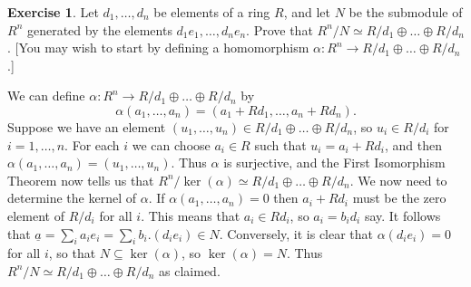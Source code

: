 \documentclass{amsart}
\newcommand{\al}        {\alpha}
\newcommand{\un}[1]     {\underline{#1}}
\newcommand{\sse}       {\subseteq}
\newcommand{\xra}       {\xrightarrow}
\newcommand{\op}        {\oplus}
\renewcommand{\:}{\colon}
\theoremstyle{definition}
\newtheorem{exercise}{Exercise}[section]
\renewenvironment{solution}{\SolutionAtEnd}{\endSolutionAtEnd}
\begin{document}
\begin{exercise}
 Let $d_1,\ldots,d_n$ be elements of a ring $R$, and let $N$ be the
 submodule of $R^n$ generated by the elements $d_1e_1,\ldots,d_ne_n$.
 Prove that $R^n/N\simeq R/d_1\op\ldots\op R/d_n$.  [You may wish to
 start by defining a homomorphism
 $\al\:R^n\xra{}R/d_1\op\ldots\op R/d_n$.]
\end{exercise}
\begin{solution}
 We can define $\al\:R^n\xra{}R/d_1\op\ldots\op R/d_n$ by 
 \[ \al(a_1,\ldots,a_n) = (a_1+Rd_1,\ldots,a_n+Rd_n). \]
 Suppose we have an element
 $(u_1,\ldots,u_n)\in R/d_1\op\ldots\op R/d_n$, so $u_i\in R/d_i$ for
 $i=1,\ldots,n$.  For each $i$ we can choose $a_i\in R$ such that
 $u_i=a_i+Rd_i$, and then $\al(a_1,\ldots,a_n)=(u_1,\ldots,u_n)$.
 Thus $\al$ is surjective, and the First Isomorphism Theorem now tells
 us that $R^n/\ker(\al)\simeq R/d_1\op\ldots\op R/d_n$.  We now need
 to determine the kernel of $\al$.  If $\al(a_1,\ldots,a_n)=0$ then
 $a_i+Rd_i$ must be the zero element of $R/d_i$ for all $i$.  This
 means that $a_i\in Rd_i$, so $a_i=b_id_i$ say.  It follows that
 $\un{a}=\sum_ia_ie_i=\sum_ib_i.(d_ie_i)\in N$.  Conversely, it is
 clear that $\al(d_ie_i)=0$ for all $i$, so that $N\sse\ker(\al)$, so
 $\ker(\al)=N$.  Thus $R^n/N\simeq R/d_1\op\ldots\op R/d_n$ as
 claimed. 
\end{solution}
\end{document}
